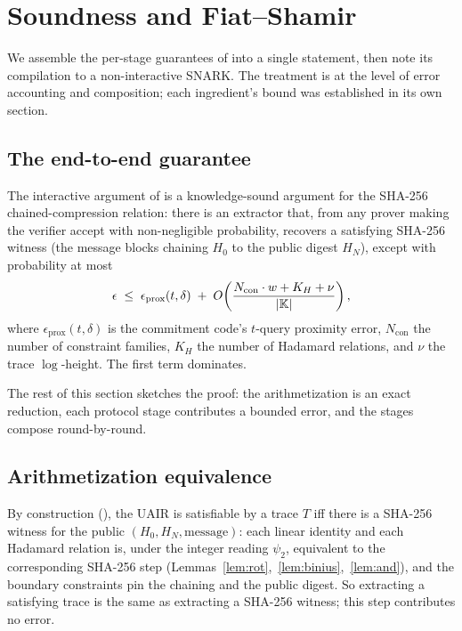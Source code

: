 \section{Soundness and Fiat--Shamir}
\label{sec:soundness}

We assemble the per-stage guarantees of
 into a single statement,
then note its compilation to a non-interactive SNARK. The treatment is at the
level of error accounting and composition; each ingredient's bound was
established in its own section.

\subsection{The end-to-end guarantee}
\label{sec:e2e}

\begin{theorem}
\label{thm:e2e}
The interactive argument of  is a
knowledge-sound argument for the SHA-256 chained-compression relation: there is
an extractor that, from any prover making the verifier accept with
non-negligible probability, recovers a satisfying SHA-256 witness (the message
blocks chaining $H_0$ to the public digest $H_N$), except with probability at
most
\[
  \epsilon \;\le\;
  \epsilon_{\mathrm{prox}}(t,\delta)
  \;+\;
  O\!\left(\frac{N_{\mathrm{con}} \cdot w + K_H + \nu}{|\mathbb{K}|}\right),
\]
where $\epsilon_{\mathrm{prox}}(t,\delta)$ is the commitment code's $t$-query
proximity error, $N_{\mathrm{con}}$ the number of constraint families, $K_H$ the
number of Hadamard relations, and $\nu$ the trace $\log$-height. The first term
dominates.
\end{theorem}

The rest of this section sketches the proof: the arithmetization is an exact
reduction, each protocol stage contributes a bounded error, and the stages
compose round-by-round.

\subsection{Arithmetization equivalence}
\label{sec:arith-equiv}

By construction (), the UAIR is satisfiable by a trace $T$ iff
there is a SHA-256 witness for the public $(H_0,H_N,\text{message})$: each linear
identity and each Hadamard relation is, under the integer reading $\psi_2$,
equivalent to the corresponding SHA-256 step
(Lemmas~\ref{lem:rot},~\ref{lem:binius},~\ref{lem:and}), and the boundary
constraints pin the chaining and the public digest. So extracting a satisfying
trace is the same as extracting a SHA-256 witness; this step contributes no
error.

